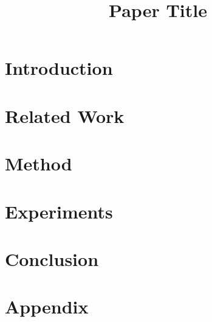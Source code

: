\documentclass{article}
\title{Paper Title}
\begin{document}
\maketitle

\begin{abstract}
\end{abstract}

\section{Introduction}
\label{sec:intro}

\section{Related Work}
\label{sec:related}

\section{Method}
\label{sec:method}

\section{Experiments}
\label{sec:experiments}

\section{Conclusion}
\label{sec:conclusion}

\begin{ack}
\end{ack}




\newpage
\appendix
\section{Appendix}
\end{document}

